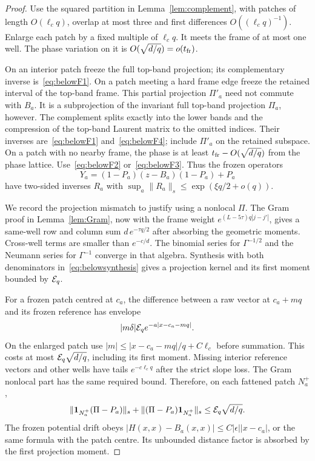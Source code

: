 \begin{proof}
Use the squared partition in Lemma~\ref{lem:complement}, with patches of length $O(\ell_cq)$, overlap at most three and first differences $O((\ell_cq)^{-1})$. Enlarge each patch by a fixed multiple of $\ell_cq$. It meets the frame of at most one well. The phase variation on it is $O(\sqrt{d/q})=o(t_{\rm fr})$.

On an interior patch freeze the full top-band projection; its complementary inverse is~\eqref{eq:belowF1}. On a patch meeting a hard frame edge freeze the retained interval of the top-band frame. This partial projection $\Pi'_a$ need not commute with $B_a$. It is a subprojection of the invariant full top-band projection $\Pi_a$, however. The complement splits exactly into the lower bands and the compression of the top-band Laurent matrix to the omitted indices. Their inverses are~\eqref{eq:belowF1} and~\eqref{eq:belowF4}; include $\Pi'_a$ on the retained subspace. On a patch with no nearby frame, the phase is at least $t_{\rm fr}-O(\sqrt{d/q})$ from the phase lattice. Use~\eqref{eq:belowF2} or~\eqref{eq:belowF3}. Thus the frozen operators
\[
 Y_a=(1-P_a)(z-B_a)(1-P_a)+P_a
\]
have two-sided inverses $R_a$ with
$\sup_a\|R_a\|_s\le \exp(\xi q/2+o(q))$.

We record the projection mismatch to justify using a nonlocal $\Pi$.
The Gram proof in Lemma~\ref{lem:Gram}, now with the frame weight
$e^{(L-5\tau)q|j-j'|}$, gives a same-well row and column sum
$d\,e^{-\tau q/2}$ after absorbing the geometric moments. Cross-well terms are smaller than $e^{-c/d}$. The binomial series for $\Gamma^{-1/2}$ and the Neumann series for $\Gamma^{-1}$ converge in that algebra. Synthesis with both denominators in~\eqref{eq:belowsynthesis} gives a projection kernel and its first moment bounded by $\mathcal E_q$.

For a frozen patch centred at $c_a$, the difference between a raw vector at $c_a+mq$ and its frozen reference has envelope
\[
 |m\delta|\mathcal E_q e^{-a|x-c_a-mq|}.
\]
On the enlarged patch use
$|m|\le |x-c_a-mq|/q+C\ell_c$ before summation. This costs at most $\mathcal E_q\sqrt{d/q}$, including its first moment. Missing interior reference vectors and other wells have tails $e^{-c\ell_cq}$ after the strict slope loss. The Gram nonlocal part has the same required bound. Therefore, on each fattened patch $N_a^+$,
\[
 \|\mathbf 1_{N_a^+}(\Pi-P_a)\|_s+
 \|(\Pi-P_a)\mathbf 1_{N_a^+}\|_s\le\mathcal E_q\sqrt{d/q}.
\]
The frozen potential drift obeys
$|H(x,x)-B_a(x,x)|\le C|\epsilon||x-c_a|$, or the same formula with the patch centre. Its unbounded distance factor is absorbed by the first projection moment.


\end{proof}
